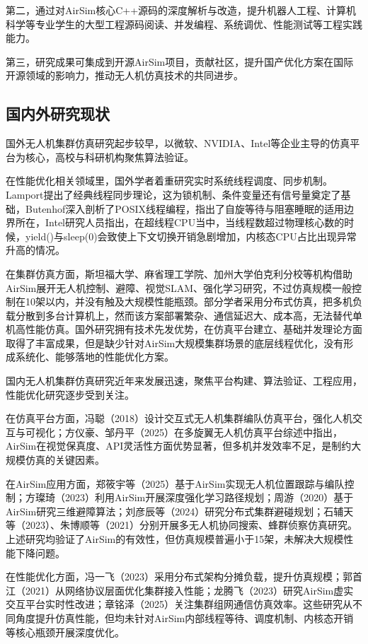 第二，通过对AirSim核心C++源码的深度解析与改造\cite{li2023}，提升机器人工程、计算机科学等专业学生的大型工程源码阅读、并发编程、系统调优、性能测试等工程实践能力。

第三，研究成果可集成到开源AirSim项目，贡献社区，提升国产优化方案在国际开源领域的影响力，推动无人机仿真技术的共同进步。

\subsection{国内外研究现状}

国外无人机集群仿真研究起步较早，以微软、NVIDIA、Intel等企业主导的仿真平台为核心，高校与科研机构聚焦算法验证。

在性能优化相关领域里，国外学者着重研究实时系统线程调度、同步机制。Lamport提出了经典线程同步理论，这为锁机制、条件变量还有信号量奠定了基础，Butenhof深入剖析了POSIX线程编程，指出了自旋等待与阻塞睡眠的适用边界所在，Intel研究人员指出，在超线程CPU当中，当线程数超过物理核心数的时候，yield()与sleep(0)会致使上下文切换开销急剧增加，内核态CPU占比出现异常升高的情况。

在集群仿真方面，斯坦福大学、麻省理工学院、加州大学伯克利分校等机构借助AirSim展开无人机控制、避障、视觉SLAM、强化学习研究，不过仿真规模一般控制在10架以内，并没有触及大规模性能瓶颈。部分学者采用分布式仿真，把多机负载分散到多台计算机上，然而该方案部署繁杂、通信延迟大、成本高，无法替代单机高性能仿真。国外研究拥有技术先发优势，在仿真平台建立、基础并发理论方面取得了丰富成果，但是缺少针对AirSim大规模集群场景的底层线程优化，没有形成系统化、能够落地的性能优化方案。

国内无人机集群仿真研究近年来发展迅速，聚焦平台构建、算法验证、工程应用，性能优化研究逐步受到关注。

在仿真平台方面，冯聪（2018）设计交互式无人机集群编队仿真平台，强化人机交互与可视化\cite{feng2018}；方仪豪、邹丹平（2025）在多旋翼无人机仿真平台综述中指出，AirSim在视觉保真度、API灵活性方面优势显著，但多机并发效率不足，是制约大规模仿真的关键因素。

在AirSim应用方面，郑筱宇等（2025）基于AirSim实现无人机位置跟踪与编队控制；方璨琦（2023）利用AirSim开展深度强化学习路径规划；周游（2020）基于AirSim研究三维避障算法；刘彦辰等（2024）研究分布式集群避碰规划；石辅天等（2023）、朱博顺等（2021）分别开展多无人机协同搜索、蜂群侦察仿真研究。上述研究均验证了AirSim的有效性，但仿真规模普遍小于15架，未解决大规模性能下降问题。

在性能优化方面，冯一飞（2023）采用分布式架构分摊负载，提升仿真规模；郭首江（2021）从网络协议层面优化集群接入性能；龙腾飞（2023）研究AirSim虚实交互平台实时性改进；章铭泽（2025）关注集群组网通信仿真效率。这些研究从不同角度提升仿真性能，但均未针对AirSim内部线程等待、调度机制、内核态开销等核心瓶颈开展深度优化。

